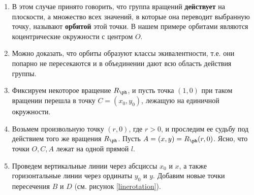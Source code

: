 \begin{enumerate}
\item В этом случае принято говорить, что группа вращений \textbf{действует} на плоскости, а множество всех значений, в которые она переводит выбранную точку, называют \textbf{орбитой} этой точки. В нашем примере орбитами являются коцентрические окружности с центром $O$.
\item Можно доказать, что орбиты образуют классы экивалентности, т.е. они попарно не пересекаются и в объединении дают всю область действия группы.
\item Фиксируем некоторое вращение $R_\ph$, и пусть точка $(1,0)$ при таком вращении перешла в точку $C=(x_0,y_0)$, лежащую на единичной окружности.
\item Возьмем произвольную точку $(r,0)$, где $r>0$, и проследим ее судьбу под действием того же вращения $R_\ph$. Пусть $A=(x,y)=R_\ph(r,0)$. Ясно, что точки $O,C,A$ лежат на одной прямой $l$.
\item Проведем вертикальные линии через абсциссы $x_0$ и $x$, а также горизонтальные линии через ординаты $y_0$ и $y$. Добавим новые точки пересечения $B$ и $D$ (см. рисунок \ref{linerotation}).


\end{enumerate}
